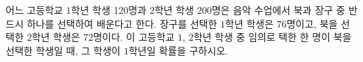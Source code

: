 어느 고등학교 $1$학년 학생 120명과 $2$학년 학생 200명은 음악 수업에서 북과 장구 중 반드시 하나를 선택하여 배운다고 한다. 장구를 선택한 $1$학년 학생은 76명이고, 북을 선택한 $2$학년 학생은 72명이다. 이 고등학교 $1$, $2$학년 학생 중 임의로 택한 한 명이 북을 선택한 학생일 때, 그 학생이 $1$학년일 확률을 구하시오.
